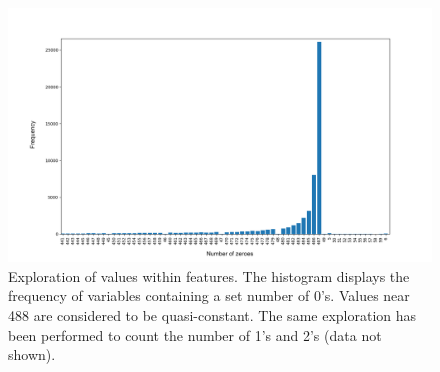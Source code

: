 \begin{figure}
    \centering
    \includegraphics{Minor Thesis/figures/histo/Counter.png}
    \caption{Exploration of values within features. The histogram displays the frequency of variables containing a set number of 0's. Values near 488 are considered to be quasi-constant. The same exploration has been performed to count the number of 1's and 2's (data not shown).}
    \label{fig:counter}
\end{figure}
